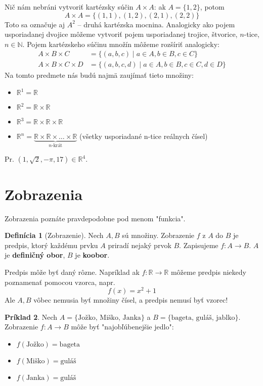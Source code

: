 \documentclass[12pt, a4paper]{article}
\theoremstyle{definition}
\newtheorem{definition}{Definícia}[section]
\newtheorem{example}[definition]{Príklad}
\theoremstyle{plain}
\theoremstyle{remark}
\begin{document}
Nič nám nebráni vytvoriť kartézsky súčin $A \times A$: ak $A=\{1,2\}$, potom
$$A \times A = \{(1,1), (1,2), (2,1), (2,2)\}$$
Toto sa označuje aj $A^2$ -- druhá kartézska mocnina.
Analogicky ako pojem usporiadanej dvojice môžeme vytvoriť pojem usporiadanej trojice, štvorice, $n$-tice, $n \in \mathbb{N}$.
Pojem kartézskeho súčinu množín môžeme rozšíriť analogicky:
\begin{align*}
    A \times B \times C &= \{(a,b,c) \mid a \in A, b \in B, c \in C\} \\
    A \times B \times C \times D &= \{(a,b,c,d) \mid a \in A, b \in B, c \in C, d \in D\}
\end{align*}
Na tomto predmete nás budú najmä zaujímať tieto množiny:
\begin{itemize}
    \item $\mathbb{R}^1 = \mathbb{R}$
    \item $\mathbb{R}^2 = \mathbb{R} \times \mathbb{R}$
    \item $\mathbb{R}^3 = \mathbb{R} \times \mathbb{R} \times \mathbb{R}$
    \item $\mathbb{R}^n = \underbrace{\mathbb{R} \times \mathbb{R} \times \dots \times \mathbb{R}}_{n\text{-krát}}$ (všetky usporiadané n-tice reálnych čísel)
\end{itemize}
Pr. $(1, \sqrt{2}, -\pi, 17) \in \mathbb{R}^4$.

\section{Zobrazenia}
Zobrazenia poznáte pravdepodobne pod menom "funkcia".
\begin{definition}[Zobrazenie]
Nech $A, B$ sú množiny. Zobrazenie $f$ z $A$ do $B$ je predpis, ktorý každému prvku $A$ priradí nejaký prvok $B$. Zapisujeme $f \colon A \to B$.
$A$ je \textbf{definičný obor}, $B$ je \textbf{koobor}.
\end{definition}

Predpis môže byť daný rôzne.
Napríklad ak $f \colon \mathbb{R} \to \mathbb{R}$ môžeme predpis niekedy poznamenať pomocou vzorca, napr.
$$f(x) = x^2+1$$
Ale $A, B$ vôbec nemusia byť množiny čísel, a predpis nemusí byť vzorec!
\begin{example}
Nech $A = \{\text{Jožko, Miško, Janka}\}$ a $B = \{\text{bageta, guláš, jablko}\}$.
Zobrazenie $f \colon A \to B$ môže byť "najobľúbenejšie jedlo":
\begin{itemize}
    \item $f(\text{Jožko}) = \text{bageta}$
    \item $f(\text{Miško}) = \text{guláš}$
    \item $f(\text{Janka}) = \text{guláš}$
\end{itemize}
\end{example}
\end{document}
